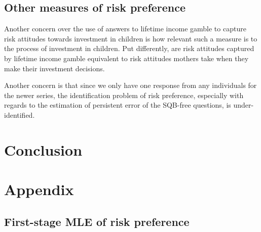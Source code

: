 \documentclass[]{article}
\begin{document}
\subsection{Other measures of risk preference}

Another concern over the use of answers to lifetime income gamble to capture risk attitudes towards investment in children is how relevant such a measure is to the process of investment in children. Put differently, are risk attitudes captured by lifetime income gamble equivalent to risk attitudes mothers take when they make their investment decisions.  



Another concern is that since we only have one response from any individuals for the newer series, the identification problem of risk preference, especially with regards to the estimation of persistent error of the SQB-free questions, is under-identified. 




\section{Conclusion}





\pagebreak





\pagebreak

\section{Appendix}
\subsection{First-stage MLE of risk preference}
\end{document}
